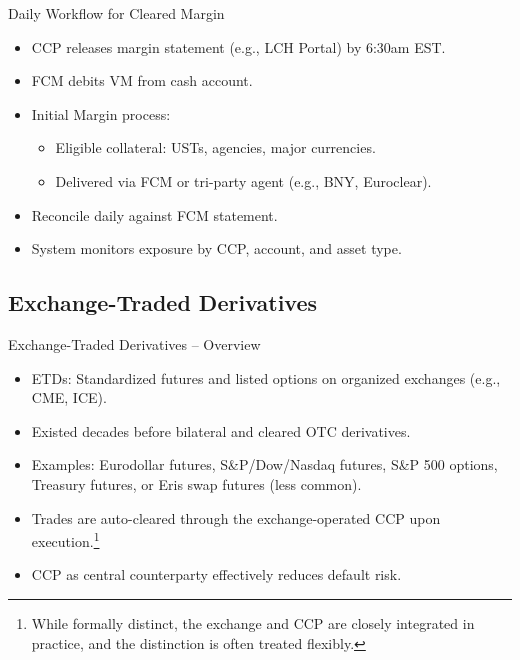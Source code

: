 \documentclass[handout, aspectratio=169]{beamer}
\begin{document}
\begin{frame}{Daily Workflow for Cleared Margin}
  \begin{itemize}
    \item CCP releases margin statement (e.g., LCH Portal) by 6:30am EST.
    \item FCM debits VM from cash account.
    \item Initial Margin process:
    \begin{itemize}
      \item Eligible collateral: USTs, agencies, major currencies.
      \item Delivered via FCM or tri-party agent (e.g., BNY, Euroclear).
    \end{itemize}
    \item Reconcile daily against FCM statement.
    \item System monitors exposure by CCP, account, and asset type.
  \end{itemize}
\end{frame}
  
\subsection{Exchange-Traded Derivatives}
\begin{frame}{Exchange-Traded Derivatives – Overview}
  \begin{itemize}
    \item ETDs: Standardized futures and listed options on organized exchanges (e.g., CME, ICE).
    \item Existed decades before bilateral and cleared OTC derivatives.
    \item Examples: Eurodollar futures, S\&P/Dow/Nasdaq futures, S\&P 500 options, Treasury futures, or Eris swap futures (less common).
    \item Trades are auto-cleared through the exchange-operated CCP upon execution.\footnote{While formally distinct, the exchange and CCP are closely integrated in practice, and the distinction is often treated flexibly.}
    \item CCP as central counterparty effectively reduces default risk.
  \end{itemize}
\end{frame}
\end{document}

